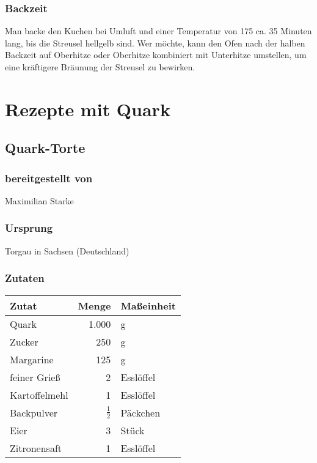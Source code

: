\documentclass[a4paper]{book}
\begin{document}
\subsubsection{Backzeit}
	Man backe den Kuchen bei Umluft und einer Temperatur von 175{\textcelsius} ca. 35 Minuten lang, bis die Streusel hellgelb sind. Wer möchte, kann den Ofen nach der halben Backzeit auf Oberhitze oder Oberhitze kombiniert mit Unterhitze umstellen, um eine kräftigere Bräunung der Streusel zu bewirken.




\section{Rezepte mit Quark}

\newpage
\subsection{Quark-Torte}

\subsubsection{bereitgestellt von}
	Maximilian Starke
\subsubsection{Ursprung}
	Torgau in Sachsen (Deutschland)
\subsubsection{Zutaten}
\begin{center}
	\begin{tabular}{|l|rl|}
		\hline
		\textbf{Zutat} & \textbf{Menge} & \textbf{Maßeinheit} \\
		\hline
		Quark & 1.000 & g \\
		Zucker & 250 & g \\
		\hline
		Margarine & 125 & g \\
		feiner Grieß & 2 & Esslöffel \\
		\hline
		Kartoffelmehl & 1 & Esslöffel \\
		Backpulver & $\frac{1}{2}$ & Päckchen \\
		\hline
		Eier & 3 & Stück \\
		Zitronensaft & 1 & Esslöffel \\
		\hline
	\end{tabular}
\end{center}
\end{document}
